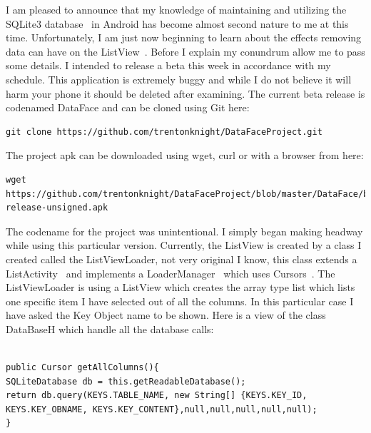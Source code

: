 \documentclass[fontsize=11pt, %
paper=a4, %
twoside, %
captions=tableheading,
index=totoc,
hyperref]{labbook}
\begin{document}

\labday{\today}

\begin{onehalfspace}
I am pleased to announce that my knowledge of maintaining and utilizing the SQLite3 database~\citep{sqlite} in Android has become almost second nature to me at this time. Unfortunately, I am just now beginning to learn about the effects removing data can have on the ListView~\citep{ListView}. Before I explain my conundrum allow me to pass some details. I intended to release a beta this week in accordance with my schedule. This application is extremely buggy and while I do not believe it will harm your phone it should be deleted after examining. The current beta release is codenamed DataFace and can be cloned using Git here:
\end{onehalfspace}
\begin{verbatim}
git clone https://github.com/trentonknight/DataFaceProject.git
\end{verbatim}
\begin{onehalfspace}
The project apk can be downloaded using wget, curl or with a browser from here:
\end{onehalfspace}
\begin{verbatim}
wget https://github.com/trentonknight/DataFaceProject/blob/master/DataFace/build/apk/DataFace-release-unsigned.apk
\end{verbatim}
\begin{onehalfspace}
The codename for the project was unintentional. I simply began making headway while using this particular version. Currently, the ListView is created by a class I created called the ListViewLoader, not very original I know, this class extends a ListActivity~\citep{ListActivity} and implements a LoaderManager~\citep{lm} which uses Cursors~\citep{Cursor}. The ListViewLoader is using a ListView which creates the array type list which lists one specific item I have selected out of all the columns. In this particular case I have asked the Key Object name to be shown. Here is a view of the class DataBaseH which handle all the database calls:
\end{onehalfspace}
\begin{verbatim}

public Cursor getAllColumns(){
SQLiteDatabase db = this.getReadableDatabase();
return db.query(KEYS.TABLE_NAME, new String[] {KEYS.KEY_ID, 
KEYS.KEY_OBNAME, KEYS.KEY_CONTENT},null,null,null,null,null);
}

\end{verbatim}
\end{document}
